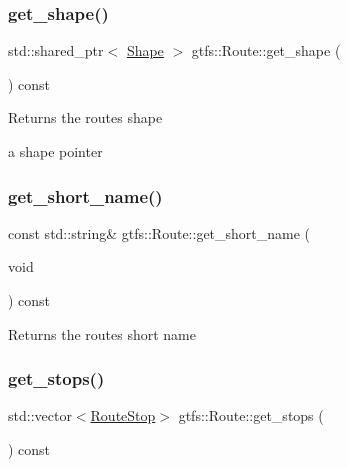\subsubsection{\texorpdfstring{get\+\_\+shape()}{get\_shape()}}
{\footnotesize\ttfamily std\+::shared\+\_\+ptr$<$ \hyperlink{classgtfs_1_1Shape}{Shape} $>$ gtfs\+::\+Route\+::get\+\_\+shape (\begin{DoxyParamCaption}{ }\end{DoxyParamCaption}) const}

\begin{DoxyReturn}{Returns}
the route\textquotesingle{}s shape

a shape pointer 
\end{DoxyReturn}
\mbox{\label{classgtfs_1_1Route_a2a0fcdf687d5e326b20c5043c9db874f}} 
\subsubsection{\texorpdfstring{get\+\_\+short\+\_\+name()}{get\_short\_name()}}
{\footnotesize\ttfamily const std\+::string\& gtfs\+::\+Route\+::get\+\_\+short\+\_\+name (\begin{DoxyParamCaption}\item[{void}]{ }\end{DoxyParamCaption}) const\hspace{0.3cm}{\ttfamily [inline]}}

\begin{DoxyReturn}{Returns}
the route\textquotesingle{}s short name 
\end{DoxyReturn}
\mbox{\label{classgtfs_1_1Route_a6992a39502af9d8bcc8bb6bb12d93b1f}} 
\subsubsection{\texorpdfstring{get\+\_\+stops()}{get\_stops()}}
{\footnotesize\ttfamily std\+::vector$<$\hyperlink{structgtfs_1_1RouteStop}{Route\+Stop}$>$ gtfs\+::\+Route\+::get\+\_\+stops (\begin{DoxyParamCaption}{ }\end{DoxyParamCaption}) const\hspace{0.3cm}{\ttfamily [inline]}}

